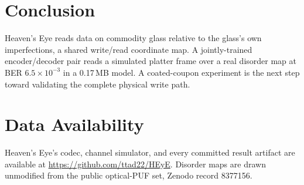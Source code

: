 \documentclass[letterpaper,twocolumn,10pt]{article}
\begin{document}
\section{Conclusion}
Heaven's Eye reads data on commodity glass relative to the glass's own imperfections,
a shared write/read coordinate map. A jointly-trained encoder/decoder pair reads a
simulated platter frame over a real disorder map at BER $6.5\times10^{-3}$ in a
0.17\,MB model. A coated-coupon experiment is the next step toward validating the
complete physical write path.

\section*{Data Availability}
Heaven's Eye's codec, channel simulator, and every committed result artifact are
available at \url{https://github.com/ttad22/HEyE}. Disorder maps are drawn unmodified
from the public optical-PUF set, Zenodo record 8377156.



\end{document}
